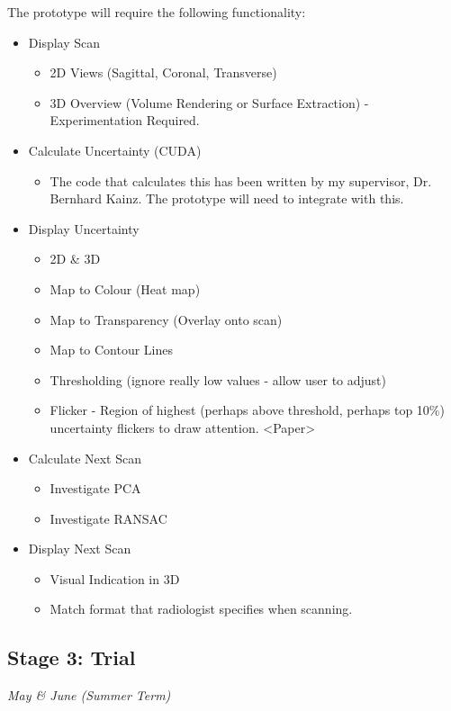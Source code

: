 \documentclass[
  oneside,
  11pt, a4paper,
  footinclude=true,
  headinclude=true,
  cleardoublepage=empty
]{scrbook}
\begin{document}
The prototype will require the following functionality:
\begin{itemize}
	\item Display Scan
	\begin{itemize}
		\item 2D Views (Sagittal, Coronal, Transverse)
		\item 3D Overview (Volume Rendering or Surface Extraction) - Experimentation Required.
	\end{itemize}
	\item Calculate Uncertainty (CUDA)
	\begin{itemize}
		\item The code that calculates this has been written by my supervisor, Dr. Bernhard Kainz. The prototype will need to integrate with this.
	\end{itemize}
	\item Display Uncertainty
	\begin{itemize}
		\item 2D \& 3D
		\item Map to Colour (Heat map)
		\item Map to Transparency (Overlay onto scan)
		\item Map to Contour Lines
		\item Thresholding (ignore really low values - allow user to adjust)
		\item Flicker - Region of highest (perhaps above threshold, perhaps top 10\%) uncertainty flickers to draw attention. <Paper>
	\end{itemize}
	\item Calculate Next Scan
	\begin{itemize}
		\item Investigate PCA
		\item Investigate RANSAC
	\end{itemize}
	\item Display Next Scan
	\begin{itemize}
		\item Visual Indication in 3D
		\item Match format that radiologist specifies when scanning.
	\end{itemize}
\end{itemize}

\newpage
\subsection*{Stage 3: Trial}
\textit{May \& June (Summer Term)}
\end{document}
